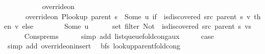 \begin{isabellebody}
\isanewline
\ \ \ \ {\isachardoublequoteopen}{\isachardot}{\kern0pt}{\isachardot}{\kern0pt}{\isachardot}{\kern0pt}\ {\isacharequal}{\kern0pt}\isanewline
\ \ \ \ \ override{\isacharunderscore}{\kern0pt}on\isanewline
\ \ \ \ \ \ {\isacharparenleft}{\kern0pt}override{\isacharunderscore}{\kern0pt}on\ {\isacharparenleft}{\kern0pt}P{\isacharunderscore}{\kern0pt}lookup\ {\isacharparenleft}{\kern0pt}parent\ s{\isacharparenright}{\kern0pt}{\isacharparenright}{\kern0pt}\ {\isacharparenleft}{\kern0pt}{\isasymlambda}{\isacharunderscore}{\kern0pt}{\isachardot}{\kern0pt}\ Some\ u{\isacharparenright}{\kern0pt}\ {\isacharparenleft}{\kern0pt}if\ {\isasymnot}\ is{\isacharunderscore}{\kern0pt}discovered\ src\ {\isacharparenleft}{\kern0pt}parent\ s{\isacharparenright}{\kern0pt}\ v\ then\ {\isacharbraceleft}{\kern0pt}v{\isacharbraceright}{\kern0pt}\ else\ {\isacharbraceleft}{\kern0pt}{\isacharbraceright}{\kern0pt}{\isacharparenright}{\kern0pt}{\isacharparenright}{\kern0pt}\isanewline
\ \ \ \ \ \ {\isacharparenleft}{\kern0pt}{\isasymlambda}{\isacharunderscore}{\kern0pt}{\isachardot}{\kern0pt}\ Some\ u{\isacharparenright}{\kern0pt}\isanewline
\ \ \ \ \ \ {\isacharparenleft}{\kern0pt}set\ {\isacharparenleft}{\kern0pt}filter\ {\isacharparenleft}{\kern0pt}Not\ {\isasymcirc}\ is{\isacharunderscore}{\kern0pt}discovered\ src\ {\isacharparenleft}{\kern0pt}parent\ s{\isacharparenright}{\kern0pt}{\isacharparenright}{\kern0pt}\ vs{\isacharparenright}{\kern0pt}{\isacharparenright}{\kern0pt}{\isachardoublequoteclose}\isanewline
\ \ \ \ \isamarkupfalse%
\ Cons{\isachardot}{\kern0pt}prems\isanewline
\ \ \ \ \isamarkupfalse%
\ {\isacharparenleft}{\kern0pt}simp\ add{\isacharcolon}{\kern0pt}\ list{\isacharunderscore}{\kern0pt}queue{\isacharunderscore}{\kern0pt}fold{\isacharunderscore}{\kern0pt}cong{\isacharunderscore}{\kern0pt}aux{\isacharparenright}{\kern0pt}\isanewline
\ \ \isamarkupfalse%
\ \isamarkupfalse%
\ {\isacharquery}{\kern0pt}case\isanewline
\ \ \ \ \isamarkupfalse%
\ {\isacharparenleft}{\kern0pt}simp\ add{\isacharcolon}{\kern0pt}\ override{\isacharunderscore}{\kern0pt}on{\isacharunderscore}{\kern0pt}insert{\isacharprime}{\kern0pt}{\isacharparenright}{\kern0pt}\isanewline
{}\isamarkupfalse%
%
\endisatagproof
{\isafoldproof}%
%
\isadelimproof
\isanewline
%
\endisadelimproof
\isanewline
{}\isamarkupfalse%
\ {\isacharparenleft}{\kern0pt}\ bfs{\isacharparenright}{\kern0pt}\ lookup{\isacharunderscore}{\kern0pt}parent{\isacharunderscore}{\kern0pt}fold{\isacharunderscore}{\kern0pt}cong{\isacharunderscore}{\kern0pt}{}{\isacharcolon}{\kern0pt}\isanewline

\end{isabellebody}
